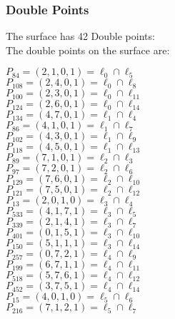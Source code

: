\documentclass{article}
\begin{document}
{\subsubsection*{Double Points}
The surface has 42 Double points:\\
The double points on the surface are:\\
\begin{multicols}{2}
\noindent
$P_{84} = ( 2, 1, 0, 1 ) = \ell_{0} \cap \ell_{5} $\\
$P_{108} = ( 2, 4, 0, 1 ) = \ell_{0} \cap \ell_{8} $\\
$P_{100} = ( 2, 3, 0, 1 ) = \ell_{0} \cap \ell_{11} $\\
$P_{124} = ( 2, 6, 0, 1 ) = \ell_{0} \cap \ell_{14} $\\
$P_{134} = ( 4, 7, 0, 1 ) = \ell_{1} \cap \ell_{4} $\\
$P_{86} = ( 4, 1, 0, 1 ) = \ell_{1} \cap \ell_{7} $\\
$P_{102} = ( 4, 3, 0, 1 ) = \ell_{1} \cap \ell_{9} $\\
$P_{118} = ( 4, 5, 0, 1 ) = \ell_{1} \cap \ell_{13} $\\
$P_{89} = ( 7, 1, 0, 1 ) = \ell_{2} \cap \ell_{3} $\\
$P_{97} = ( 7, 2, 0, 1 ) = \ell_{2} \cap \ell_{6} $\\
$P_{129} = ( 7, 6, 0, 1 ) = \ell_{2} \cap \ell_{10} $\\
$P_{121} = ( 7, 5, 0, 1 ) = \ell_{2} \cap \ell_{12} $\\
$P_{13} = ( 2, 0, 1, 0 ) = \ell_{3} \cap \ell_{4} $\\
$P_{533} = ( 4, 1, 7, 1 ) = \ell_{3} \cap \ell_{5} $\\
$P_{339} = ( 2, 1, 4, 1 ) = \ell_{3} \cap \ell_{7} $\\
$P_{401} = ( 0, 1, 5, 1 ) = \ell_{3} \cap \ell_{10} $\\
$P_{150} = ( 5, 1, 1, 1 ) = \ell_{3} \cap \ell_{14} $\\
$P_{257} = ( 0, 7, 2, 1 ) = \ell_{4} \cap \ell_{9} $\\
$P_{199} = ( 6, 7, 1, 1 ) = \ell_{4} \cap \ell_{11} $\\
$P_{518} = ( 5, 7, 6, 1 ) = \ell_{4} \cap \ell_{12} $\\
$P_{452} = ( 3, 7, 5, 1 ) = \ell_{4} \cap \ell_{14} $\\
$P_{15} = ( 4, 0, 1, 0 ) = \ell_{5} \cap \ell_{6} $\\
$P_{216} = ( 7, 1, 2, 1 ) = \ell_{5} \cap \ell_{7} $\\

\end{multicols}}
\end{document}
